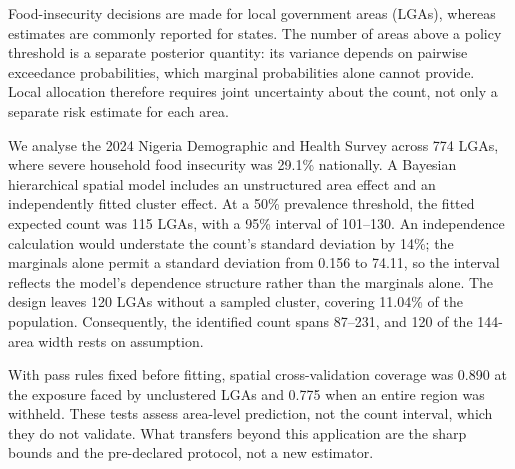 Food-insecurity decisions are made for local government areas (LGAs), whereas estimates are commonly reported for states. The number of areas above a policy threshold is a separate posterior quantity: its variance depends on pairwise exceedance probabilities, which marginal probabilities alone cannot provide. Local allocation therefore requires joint uncertainty about the count, not only a separate risk estimate for each area.

We analyse the 2024 Nigeria Demographic and Health Survey across 774 LGAs, where severe household food insecurity was 29.1\% nationally. A Bayesian hierarchical spatial model includes an unstructured area effect and an independently fitted cluster effect. At a 50\% prevalence threshold, the fitted expected count was 115 LGAs, with a 95\% interval of 101--130. An independence calculation would understate the count's standard deviation by 14\%; the marginals alone permit a standard deviation from 0.156 to 74.11, so the interval reflects the model's dependence structure rather than the marginals alone. The design leaves 120 LGAs without a sampled cluster, covering 11.04\% of the population. Consequently, the identified count spans 87--231, and 120 of the 144-area width rests on assumption.

With pass rules fixed before fitting, spatial cross-validation coverage was 0.890 at the exposure faced by unclustered LGAs and 0.775 when an entire region was withheld. These tests assess area-level prediction, not the count interval, which they do not validate. What transfers beyond this application are the sharp bounds and the pre-declared protocol, not a new estimator.
